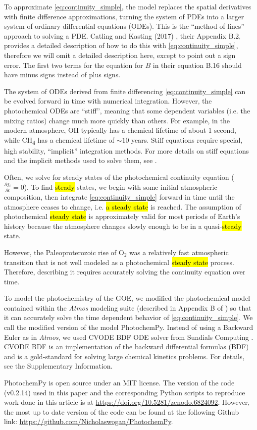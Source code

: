 \documentclass[9pt,twocolumn,twoside,lineno]{pnas-new}
\begin{document}
{To approximate \eqref{eq:continuity_simple}, the model replaces the spatial derivatives with finite difference approximations, turning the system of PDEs into a larger system of ordinary differential equations (ODEs). This is the ``method of lines'' approach to solving a PDE. Catling and Kasting (2017) \cite{Catling_2017}, their Appendix B.2, provides a detailed description of how to do this with \eqref{eq:continuity_simple}, therefore we will omit a detailed description here, except to point out a sign error. The first two terms for the equation for $B$ in their equation B.16 should have minus signs instead of plus signs.

The system of ODEs derived from finite differencing \eqref{eq:continuity_simple} can be evolved forward in time with numerical integration. However, the photochemical ODEs are ``stiff'', meaning that some dependent variables (i.e. the mixing ratios) change much more quickly than others. For example, in the modern atmosphere, OH typically has a chemical lifetime of about 1 second, while CH\textsubscript{4} has a chemical lifetime of ${\sim}10$ years. Stiff equations require special, high stability, ``implicit'' integration methods. For more details on stiff equations and the implicit methods used to solve them, see \cite{Hairer_1996}.

Often, we solve for steady states of the photochemical continuity equation ($\frac{\partial f_{i}}{\partial t} = 0$). To find \hl{steady} states, we begin with some initial atmospheric composition, then integrate \eqref{eq:continuity_simple} forward in time until the atmosphere ceases to change, i.e. \hl{a steady state} is reached. The assumption of photochemical \hl{steady state} is approximately valid for most periods of Earth's history because the atmosphere changes slowly enough to be in a quasi-\hl{steady} state.

However, the Paleoproterozoic rise of O$_2$ was a relatively fast atmospheric transition that is not well modeled as a photochemical \hl{steady state} process. Therefore, describing it requires accurately solving the continuity equation over time.

To model the photochemistry of the GOE, we modified the photochemical model contained within the \emph{Atmos} modeling suite (described in Appendix B of \cite{Catling_2017}) so that it can accurately solve the time dependent behavior of \eqref{eq:continuity_simple}. We call the modified version of the model PhotochemPy. Instead of using a Backward Euler as in \emph{Atmos}, we used CVODE BDF ODE solver from Sundials Computing \cite{Hindmarsh_2005}. CVODE BDF is an implementation of the backward differential formulas (BDF) and is a gold-standard for solving large chemical kinetics problems. For details, see the Supplementary Information.

PhotochemPy is open source under an MIT license. The version of the code (v0.2.14) used in this paper and the corresponding Python scripts to reproduce work done in this article is at \url{https://doi.org/10.5281/zenodo.6824092}. However, the most up to date version of the code can be found at the following Github link: \url{https://github.com/Nicholaswogan/PhotochemPy}.

}
\end{document}
